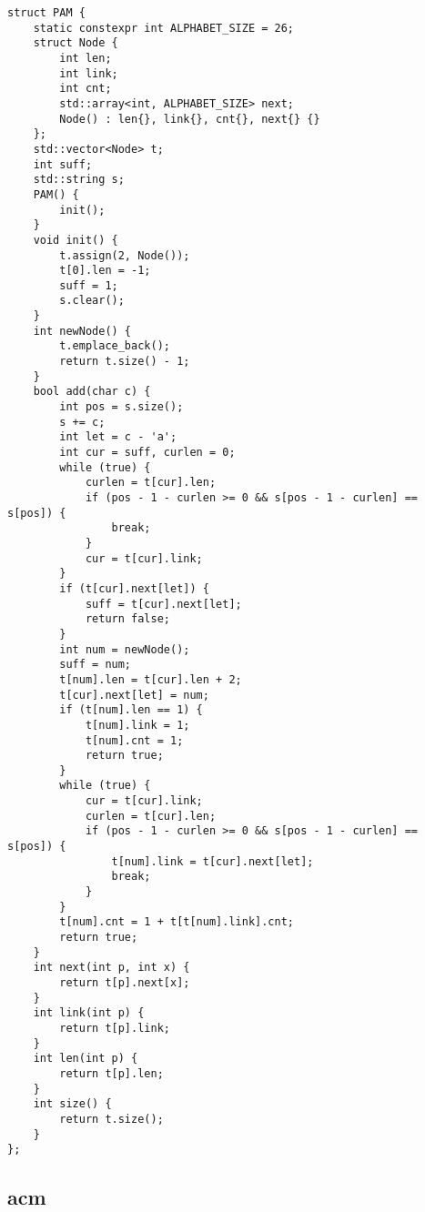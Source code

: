 \documentclass[a4paper,10pt]{article}
\begin{document}
\noindent\begin{lstlisting}
struct PAM {
    static constexpr int ALPHABET_SIZE = 26;
    struct Node {
        int len;
        int link;
        int cnt;
        std::array<int, ALPHABET_SIZE> next;
        Node() : len{}, link{}, cnt{}, next{} {}
    };
    std::vector<Node> t;
    int suff;
    std::string s;
    PAM() {
        init();
    }
    void init() {
        t.assign(2, Node());
        t[0].len = -1;
        suff = 1;
        s.clear();
    }
    int newNode() {
        t.emplace_back();
        return t.size() - 1;
    }
    bool add(char c) {
        int pos = s.size();
        s += c;
        int let = c - 'a';
        int cur = suff, curlen = 0;
        while (true) {
            curlen = t[cur].len;
            if (pos - 1 - curlen >= 0 && s[pos - 1 - curlen] == s[pos]) {
                break;
            }
            cur = t[cur].link;
        }
        if (t[cur].next[let]) {
            suff = t[cur].next[let];
            return false;
        }
        int num = newNode();
        suff = num;
        t[num].len = t[cur].len + 2;
        t[cur].next[let] = num;
        if (t[num].len == 1) {
            t[num].link = 1;
            t[num].cnt = 1;
            return true;
        }
        while (true) {
            cur = t[cur].link;
            curlen = t[cur].len;
            if (pos - 1 - curlen >= 0 && s[pos - 1 - curlen] == s[pos]) {
                t[num].link = t[cur].next[let];
                break;
            }
        }
        t[num].cnt = 1 + t[t[num].link].cnt;
        return true;
    }
    int next(int p, int x) {
        return t[p].next[x];
    }
    int link(int p) {
        return t[p].link;
    }
    int len(int p) {
        return t[p].len;
    }
    int size() {
        return t.size();
    }
};\end{lstlisting}

\subsection{acm}
\thispagestyle{fancy}
\end{document}
